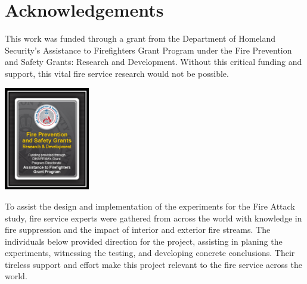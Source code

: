 \documentclass{book}
\begin{document}
\mainmatter

\chapter*{Acknowledgements}
	
This work was funded through a grant from the Department of Homeland Security's Assistance to Firefighters Grant Program under the Fire Prevention and Safety Grants: Research and Development. Without this critical funding and support, this vital fire service research would not be possible.

\vspace*{\baselineskip}

\begin{center}
	\includegraphics[width=0.28\textwidth]{Figures/General/DHS}
\end{center}

\clearpage

To assist the design and implementation of the experiments for the Fire Attack study, fire service experts were gathered from across the world with knowledge in fire suppression and the impact of interior and exterior fire streams. The individuals below provided direction for the project, assisting in planing the experiments, witnessing the testing, and developing concrete conclusions. Their tireless support and effort make this project relevant to the fire service across the world. 

\vspace*{\baselineskip}

\renewcommand{\arraystretch}{1.5}
\end{document}
